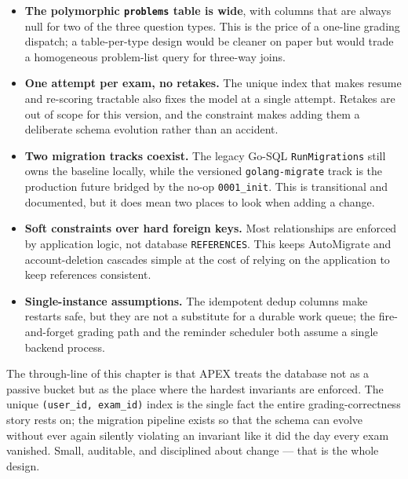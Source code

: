 \begin{itemize}[nosep]
  \item \textbf{The polymorphic \texttt{problems} table is wide}, with columns
        that are always null for two of the three question types. This is the
        price of a one-line grading dispatch; a table-per-type design would be
        cleaner on paper but would trade a homogeneous problem-list query for
        three-way joins.
  \item \textbf{One attempt per exam, no retakes.} The unique index that makes
        resume and re-scoring tractable also fixes the model at a single
        attempt. Retakes are out of scope for this version, and the constraint
        makes adding them a deliberate schema evolution rather than an
        accident.
  \item \textbf{Two migration tracks coexist.} The legacy Go-SQL
        \texttt{RunMigrations} still owns the baseline locally, while the
        versioned \texttt{golang-migrate} track is the production future
        bridged by the no-op \texttt{0001\_init}. This is transitional and
        documented, but it does mean two places to look when adding a change.
  \item \textbf{Soft constraints over hard foreign keys.} Most relationships
        are enforced by application logic, not database \texttt{REFERENCES}.
        This keeps AutoMigrate and account-deletion cascades simple at the
        cost of relying on the application to keep references consistent.
  \item \textbf{Single-instance assumptions.} The idempotent dedup columns
        make restarts safe, but they are not a substitute for a durable work
        queue; the fire-and-forget grading path and the reminder scheduler
        both assume a single backend process.
\end{itemize}

The through-line of this chapter is that APEX treats the database not as a
passive bucket but as the place where the hardest invariants are enforced.
The unique \texttt{(user\_id, exam\_id)} index is the single fact the entire
grading-correctness story rests on; the migration pipeline exists so that the
schema can evolve without ever again silently violating an invariant like it
did the day every exam vanished. Small, auditable, and disciplined about
change --- that is the whole design.
